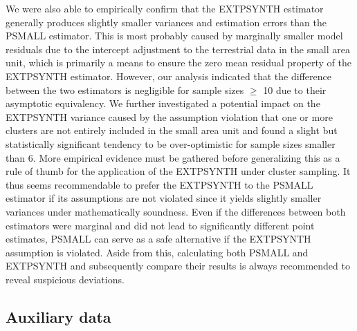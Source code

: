 \documentclass[remotesensing,article,submit,moreauthors,pdftex,10pt,a4paper]{mdpi}
\newcommand{\psmall}{PSMALL}
\newcommand{\extpsynth}{EXTPSYNTH}
\begin{document}
We were also able to empirically confirm that the \extpsynth{} estimator generally produces slightly smaller variances and estimation errors than the \psmall{} estimator. This is most probably caused by marginally smaller model residuals due to the intercept adjustment to the terrestrial data in the small area unit, which is primarily a means to ensure the zero mean residual property of the \extpsynth{} estimator. However, our analysis indicated that the difference between the two estimators is negligible for sample sizes $\geq$ 10 due to their asymptotic equivalency. We further investigated a potential impact on the \extpsynth{} variance caused by the assumption violation that one or more clusters are not entirely included in the small area unit and found a slight but statistically significant tendency to be over-optimistic for sample sizes smaller than 6. More empirical evidence must be gathered before generalizing this as a rule of thumb for the application of the \extpsynth{} under cluster sampling. It thus seems recommendable to prefer the \extpsynth{} to the \psmall{} estimator if its assumptions are not violated since it yields slightly smaller variances under mathematically soundness. Even if the differences between both estimators were marginal and did not lead to significantly different point estimates, \psmall{} can serve as a safe alternative if the \extpsynth{} assumption is violated. Aside from this, calculating both \psmall{} and \extpsynth{} and subsequently compare their results is always recommended to reveal suspicious deviations.\par


\subsection{Auxiliary data}
\end{document}
